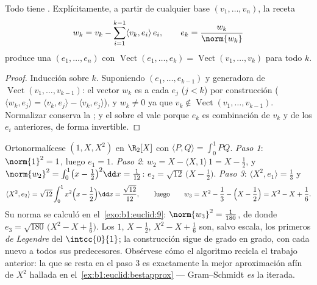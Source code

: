 \begin{theorem}\label{thm:b1:euclid:gramschmidt}
Todo  tiene  . Explícitamente, a
partir de cualquier base $(v_1, \dots, v_n)$, la
receta
\[
w_k = v_k - \sum_{i=1}^{k-1} \langle v_k, e_i\rangle\, e_i ,
\qquad
e_k = \frac{w_k}{\norm{w_k}}
\]
produce una   $(e_1, \dots, e_n)$ con
$\operatorname{Vect}(e_1, \dots, e_k) = \operatorname{Vect}(v_1,
\dots, v_k)$ para todo $k$.
\end{theorem}

\begin{proof}
Inducción sobre $k$. Suponiendo $(e_1, \dots, e_{k-1})$  y
generadora de $\operatorname{Vect}(v_1, \dots, v_{k-1})$: el vector
$w_k$ es  a cada $e_j$ ($j < k$) por construcción
($\langle w_k, e_j \rangle = \langle v_k, e_j\rangle - \langle v_k,
e_j\rangle$), y $w_k \neq 0$ ya que
$v_k \notin \operatorname{Vect}(v_1, \dots, v_{k-1})$. Normalizar
conserva la ; y el  sobre el  vale porque $e_k$ es combinación de $v_k$ y de los $e_i$
anteriores, de forma invertible.
\end{proof}

\begin{example}
\label{ex:b1:euclid:legendre}
Ortonormalícese $(1, X, X^2)$ en $\R_2[X]$ con
$\langle P, Q\rangle = \int_0^1 PQ$. \emph{Paso 1}: $\norm{1}^2 = 1$,
luego $e_1 = 1$. \emph{Paso 2}: $w_2 = X - \langle X, 1\rangle\,1 =
X - \frac12$, y
$\norm{w_2}^2 = \int_0^1\bigl(x - \frac12\bigr)^2 \dd x =
\frac1{12}$: $e_2 = \sqrt{12}\,\bigl(X - \frac12\bigr)$.
\emph{Paso 3}: $\langle X^2, e_1\rangle = \frac13$ y
\[
\langle X^2, e_2\rangle
= \sqrt{12}\int_0^1 x^2\Bigl(x - \frac12\Bigr)\dd x
= \frac{\sqrt{12}}{12},
\qquad\text{luego}\qquad
w_3 = X^2 - \frac13 - \Bigl(X - \frac12\Bigr)
= X^2 - X + \frac16 .
\]
Su norma se calculó en el~\cref{exo:b1:euclid:9}:
$\norm{w_3}^2 = \frac1{180}$, de donde
$e_3 = \sqrt{180}\,\bigl(X^2 - X + \frac16\bigr)$. Los 
$1$, $X - \frac12$, $X^2 - X + \frac16$ son, salvo escala, los
primeros \emph{ de Legendre} del 
$\intcc{0}{1}$; la construcción sigue de grado en grado, con cada
nuevo   a todos sus predecesores. Obsérvese cómo
el algoritmo recicla el trabajo anterior: la  que se resta
en el paso 3 es exactamente la mejor aproximación afín de $X^2$
hallada en el~\cref{ex:b1:euclid:bestapprox} --- Gram--Schmidt
\emph{es} la  iterada.
\end{example}

